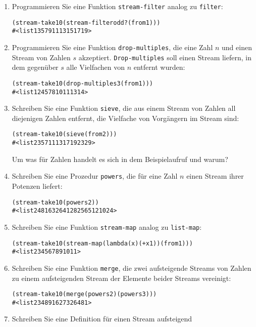 \begin{aufgabe}
\begin{enumerate}
\begin{alltt}
     \end{alltt}
   \item Programmieren Sie eine Funktion \texttt{stream-filter} analog zu
     \texttt{filter}:
     \begin{alltt}
(stream-take 10 (stream-filter odd? (from 1)))
\evalsto{} #<list 1 3 5 7 9 11 13 15 17 19>
     \end{alltt}
   \item Programmieren Sie eine Funktion \texttt{drop-multiples}, die 
     eine Zahl $n$ und einen Stream von Zahlen $s$ akzeptiert.
     \texttt{Drop-multiples} soll einen Stream liefern, in dem
     gegenüber $s$  alle Vielfachen von $n$ entfernt wurden:
     \begin{alltt}
(stream-take 10 (drop-multiples 3 (from 1)))
\evalsto{} #<list 1 2 4 5 7 8 10 11 13 14>
     \end{alltt}
   \item Schreiben Sie eine Funktion \texttt{sieve}, die aus einem Stream
     von Zahlen all diejenigen Zahlen entfernt, die Vielfache von
     Vorgängern im Stream sind:
     \begin{alltt}
(stream-take 10 (sieve (from 2)))
\evalsto{} #<list 2 3 5 7 11 13 17 19 23 29>
     \end{alltt}
     Um was für Zahlen handelt es sich in dem Beispielaufruf und
     warum?
   \item Schreiben Sie eine Prozedur \texttt{powers}, die für eine Zahl
     $n$ einen Stream ihrer Potenzen liefert:
     \begin{alltt}
(stream-take 10 (powers 2))
\evalsto{} #<list 2 4 8 16 32 64 128 256 512 1024>
     \end{alltt}
   \item Schreiben Sie eine Funktion \texttt{stream-map} analog zu
     \texttt{list-map}:
     \begin{alltt}
(stream-take 10 (stream-map (lambda (x) (+ x 1)) (from 1)))
\evalsto{} #<list 2 3 4 5 6 7 8 9 10 11>
     \end{alltt}
   \item Schreiben Sie eine Funktion \texttt{merge}, die zwei
     aufsteigende Streams von Zahlen zu einem aufsteigenden Stream
     der Elemente beider Streams vereinigt:
     \begin{alltt}
(stream-take 10 (merge (powers 2) (powers 3)))
\evalsto{} #<list 2 3 4 8 9 16 27 32 64 81>
     \end{alltt}
   \item Schreiben Sie eine Definition für einen Stream aufsteigend

\end{enumerate}
\end{aufgabe}
